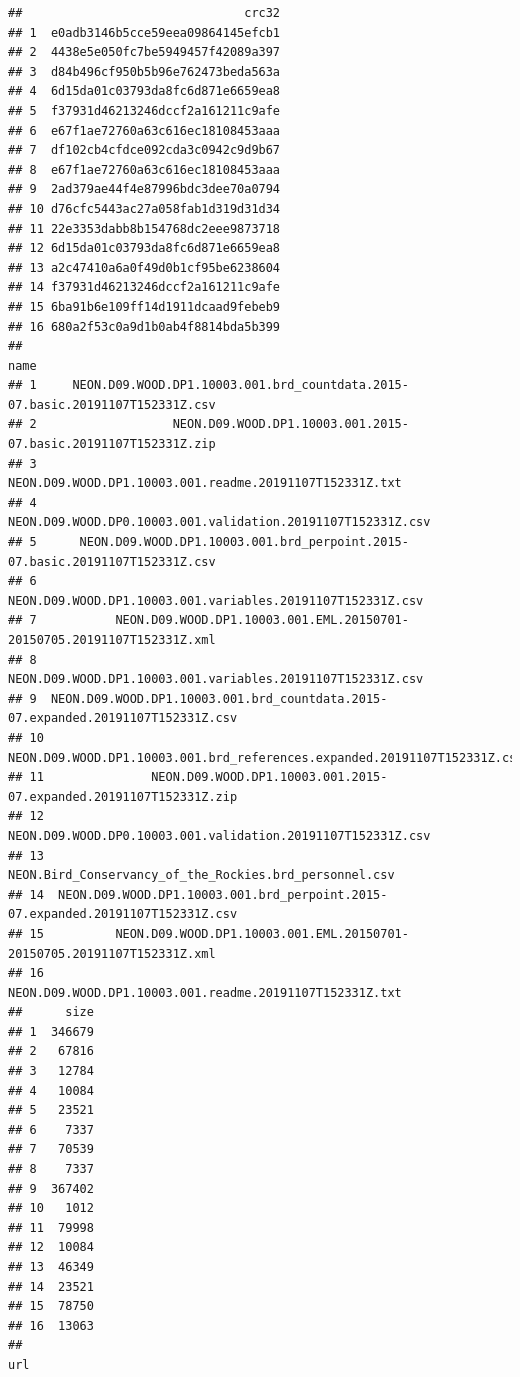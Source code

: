 \documentclass[]{book}
\begin{document}
\begin{verbatim}
##                               crc32
## 1  e0adb3146b5cce59eea09864145efcb1
## 2  4438e5e050fc7be5949457f42089a397
## 3  d84b496cf950b5b96e762473beda563a
## 4  6d15da01c03793da8fc6d871e6659ea8
## 5  f37931d46213246dccf2a161211c9afe
## 6  e67f1ae72760a63c616ec18108453aaa
## 7  df102cb4cfdce092cda3c0942c9d9b67
## 8  e67f1ae72760a63c616ec18108453aaa
## 9  2ad379ae44f4e87996bdc3dee70a0794
## 10 d76cfc5443ac27a058fab1d319d31d34
## 11 22e3353dabb8b154768dc2eee9873718
## 12 6d15da01c03793da8fc6d871e6659ea8
## 13 a2c47410a6a0f49d0b1cf95be6238604
## 14 f37931d46213246dccf2a161211c9afe
## 15 6ba91b6e109ff14d1911dcaad9febeb9
## 16 680a2f53c0a9d1b0ab4f8814bda5b399
##                                                                               name
## 1     NEON.D09.WOOD.DP1.10003.001.brd_countdata.2015-07.basic.20191107T152331Z.csv
## 2                   NEON.D09.WOOD.DP1.10003.001.2015-07.basic.20191107T152331Z.zip
## 3                          NEON.D09.WOOD.DP1.10003.001.readme.20191107T152331Z.txt
## 4                      NEON.D09.WOOD.DP0.10003.001.validation.20191107T152331Z.csv
## 5      NEON.D09.WOOD.DP1.10003.001.brd_perpoint.2015-07.basic.20191107T152331Z.csv
## 6                       NEON.D09.WOOD.DP1.10003.001.variables.20191107T152331Z.csv
## 7           NEON.D09.WOOD.DP1.10003.001.EML.20150701-20150705.20191107T152331Z.xml
## 8                       NEON.D09.WOOD.DP1.10003.001.variables.20191107T152331Z.csv
## 9  NEON.D09.WOOD.DP1.10003.001.brd_countdata.2015-07.expanded.20191107T152331Z.csv
## 10        NEON.D09.WOOD.DP1.10003.001.brd_references.expanded.20191107T152331Z.csv
## 11               NEON.D09.WOOD.DP1.10003.001.2015-07.expanded.20191107T152331Z.zip
## 12                     NEON.D09.WOOD.DP0.10003.001.validation.20191107T152331Z.csv
## 13                          NEON.Bird_Conservancy_of_the_Rockies.brd_personnel.csv
## 14  NEON.D09.WOOD.DP1.10003.001.brd_perpoint.2015-07.expanded.20191107T152331Z.csv
## 15          NEON.D09.WOOD.DP1.10003.001.EML.20150701-20150705.20191107T152331Z.xml
## 16                         NEON.D09.WOOD.DP1.10003.001.readme.20191107T152331Z.txt
##      size
## 1  346679
## 2   67816
## 3   12784
## 4   10084
## 5   23521
## 6    7337
## 7   70539
## 8    7337
## 9  367402
## 10   1012
## 11  79998
## 12  10084
## 13  46349
## 14  23521
## 15  78750
## 16  13063
##                                                                                                                                                                                                                                                                                                                                                                                                                                                                                        url

\end{verbatim}
\end{document}
